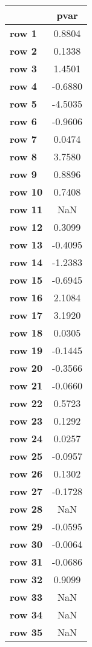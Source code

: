 \begin{tiny}\begin{tabular}{|l|c|}
\hline
&\textbf{pvar}\\\hline
\textbf{row 1}&0.8804\\\hline
\textbf{row 2}&0.1338\\\hline
\textbf{row 3}&1.4501\\\hline
\textbf{row 4}&-0.6880\\\hline
\textbf{row 5}&-4.5035\\\hline
\textbf{row 6}&-0.9606\\\hline
\textbf{row 7}&0.0474\\\hline
\textbf{row 8}&3.7580\\\hline
\textbf{row 9}&0.8896\\\hline
\textbf{row 10}&0.7408\\\hline
\textbf{row 11}&NaN\\\hline
\textbf{row 12}&0.3099\\\hline
\textbf{row 13}&-0.4095\\\hline
\textbf{row 14}&-1.2383\\\hline
\textbf{row 15}&-0.6945\\\hline
\textbf{row 16}&2.1084\\\hline
\textbf{row 17}&3.1920\\\hline
\textbf{row 18}&0.0305\\\hline
\textbf{row 19}&-0.1445\\\hline
\textbf{row 20}&-0.3566\\\hline
\textbf{row 21}&-0.0660\\\hline
\textbf{row 22}&0.5723\\\hline
\textbf{row 23}&0.1292\\\hline
\textbf{row 24}&0.0257\\\hline
\textbf{row 25}&-0.0957\\\hline
\textbf{row 26}&0.1302\\\hline
\textbf{row 27}&-0.1728\\\hline
\textbf{row 28}&NaN\\\hline
\textbf{row 29}&-0.0595\\\hline
\textbf{row 30}&-0.0064\\\hline
\textbf{row 31}&-0.0686\\\hline
\textbf{row 32}&0.9099\\\hline
\textbf{row 33}&NaN\\\hline
\textbf{row 34}&NaN\\\hline
\textbf{row 35}&NaN\\\hline

\end{tabular}
\end{tiny}
